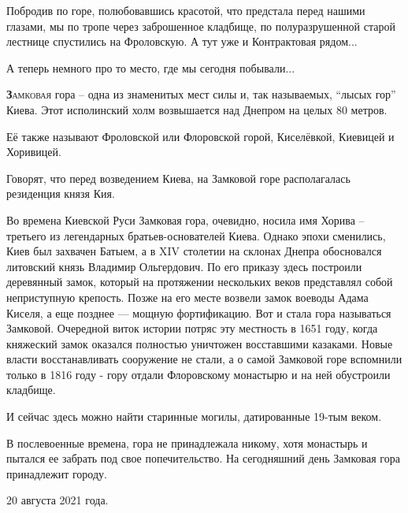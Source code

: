 Побродив по горе, полюбовавшись красотой, что предстала перед нашими глазами, мы
по тропе через заброшенное кладбище, по полуразрушенной старой лестнице
спустились на Фроловскую. А тут уже и Контрактовая рядом...


А теперь немного про то место, где мы сегодня побывали...

\lettrine[lraise=0.1, nindent=0em, slope=-.5em, lines=2]{\textbf{З}}{амковая}
гора – одна из знаменитых мест силы и, так называемых, \enquote{лысых гор}
Киева. Этот исполинский холм возвышается над Днепром на целых 80 метров.

Её также называют Фроловской или Флоровской горой, Киселёвкой, Киевицей и
Хоривицей.

Говорят, что перед возведением Киева, на Замковой горе располагалась резиденция
князя Кия. 

Во времена Киевской Руси Замковая гора, очевидно, носила имя Хорива – третьего
из легендарных братьев-основателей Киева. Однако эпохи сменились, Киев был
захвачен Батыем, а в XIV столетии на склонах Днепра обосновался литовский князь
Владимир Ольгердович. По его приказу здесь построили деревянный замок, который
на протяжении нескольких веков представлял собой неприступную крепость. Позже
на его месте возвели замок воеводы Адама Киселя, а еще позднее — мощную
фортификацию. Вот и стала гора называться Замковой. Очередной виток истории
потряс эту местность в 1651 году, когда княжеский замок оказался полностью
уничтожен восставшими казаками. Новые власти восстанавливать сооружение не
стали, а о самой Замковой горе вспомнили только в 1816 году  - гору отдали
Флоровскому монастырю и на ней обустроили кладбище.

И сейчас здесь можно найти старинные могилы, датированные 19-тым веком.

В послевоенные времена, гора не принадлежала никому, хотя монастырь и пытался
ее забрать под свое попечительство. На сегодняшний день Замковая гора
принадлежит городу.

20 августа 2021 года.
